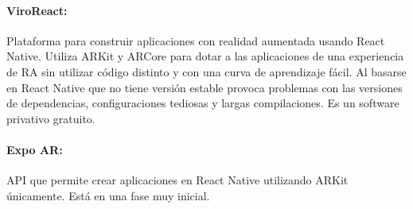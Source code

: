 \paragraph{ViroReact:}
Plataforma para construir aplicaciones con realidad aumentada usando React Native.
 Utiliza ARKit y ARCore para dotar a las aplicaciones de una experiencia de RA sin
 utilizar código distinto y con una curva de aprendizaje fácil. Al basarse en React
 Native que no tiene versión estable provoca problemas con las versiones de dependencias,
 configuraciones tediosas y largas compilaciones.
Es un software privativo gratuito.

\paragraph{Expo AR:}
API que permite crear aplicaciones en React Native utilizando ARKit únicamente.
Está en una fase muy inicial.

